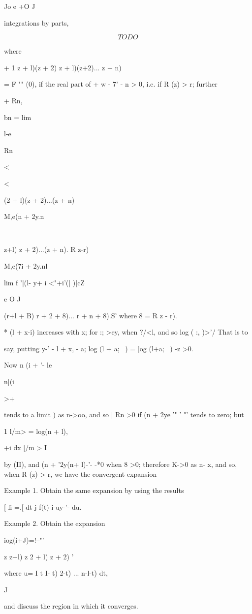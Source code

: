 {Jo e +O J

integrations by parts,

$$
TODO
$$

where

+ 1 z + l)(z + 2) z + l)(z+2)... z + n)

= F "" (0), if the real part of + w - 7' - n > 0, i.e. if R (z) > r;
further

+ Rn,

bn = lim

l-e

Rn\ \

<

<

(2 + l)(z + 2)...(z + n)

M,e(n + 2y.n\

\ \ {z+l) z + 2)...(z + n). R z-r)

M,e(7i + 2y.nl

lim f '|(l- y+ i <"+i'(| )|cZ

e O J

(r+l + B) r + 2 + 8)... r + n + 8).S' where 8 = R z - r).

* (l + x-i) increases with x; for :; >ey, when ?/<l, and so log ( :,
)>'/ That is to

say, putting y-' - l + x, - a; log (l + a;~ ) = ]og (l+a;~ ) -z >0.

%
%

Now n (i + '- le

n|(i

>+

tends to a limit ) as n->oo, and so | Rn >0 if (n + 2ye '" '
"' tends to zero; but

1 l/m> = log(n + l),

 +i dx [/m > I

by (II), and (n + '2y(n+ l)-'- -*0 when 8 >0; therefore K->0 as
n- x, and so, when R (z) > r, we have the convergent expansion

Example 1. Obtain the same expansion by using the results

[ fi =.[ dt j f(t) i-uy-'- du.

Example 2. Obtain the expansion

iog(i+J)=!--"'

z z+l) z 2 + l) z + 2) '

where u= I t I- t) 2-t) ... n-l-t) dt,

J

and discuss the region in which it converges. 

}}
